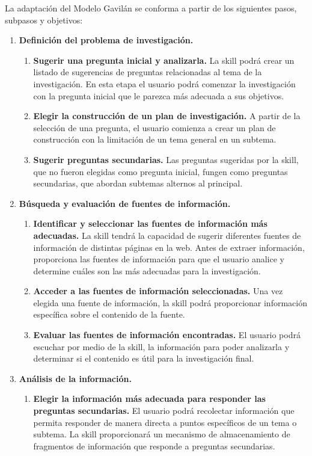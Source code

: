 La adaptación del Modelo Gavilán se conforma a partir de los siguientes pasos, subpasos y objetivos:

\begin{enumerate}
  \item \textbf{Definición del problema de investigación.}
  \begin{enumerate}[1.]
    \item \textbf{Sugerir una pregunta inicial y analizarla.} La skill podrá crear un listado de sugerencias de preguntas relacionadas al tema de la investigación. En esta etapa el usuario podrá comenzar la investigación con la pregunta inicial que le parezca más adecuada a sus objetivos.
    \item \textbf{Elegir la construcción de un plan de investigación.} A partir de la selección de una pregunta, el usuario comienza a crear un plan de construcción con la limitación de un tema general en un subtema.
    \item \textbf{Sugerir preguntas secundarias.} Las preguntas sugeridas por la skill, que no fueron elegidas como pregunta inicial, fungen como preguntas secundarias, que abordan subtemas alternos al principal.
  \end{enumerate}
  \item \textbf{Búsqueda y evaluación de fuentes de información.}
  \begin{enumerate}[1.]
    \item \textbf{Identificar y seleccionar las fuentes de información más adecuadas.} La skill tendrá la capacidad de sugerir diferentes fuentes de información de distintas páginas en la web. Antes de extraer información, proporciona las fuentes de información para que el usuario analice y determine cuáles son las más adecuadas para la investigación.
    \item \textbf{Acceder a las fuentes de información seleccionadas.} Una vez elegida una fuente de información, la skill podrá proporcionar información específica sobre el contenido de la fuente.
    \item \textbf{Evaluar las fuentes de información encontradas.} El usuario podrá escuchar por medio de la skill, la información para poder analizarla y determinar si el contenido es útil para la investigación final.
  \end{enumerate}
  \item \textbf{Análisis de la información.}
  \begin{enumerate}[1.]
    \item \textbf{Elegir la información más adecuada para responder las preguntas secundarias.} El usuario podrá recolectar información que permita responder de manera directa a puntos específicos de un tema o subtema. La skill proporcionará un mecanismo de almacenamiento de fragmentos de información que responde a preguntas secundarias.

\end{enumerate}
\end{enumerate}
